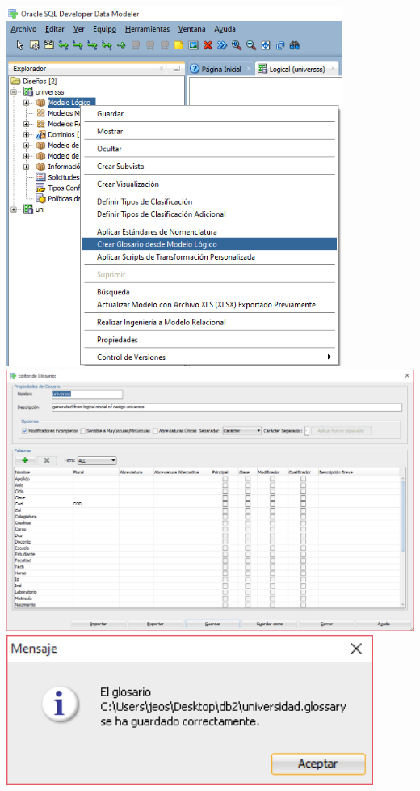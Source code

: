 \documentclass[a4paper,openright,12pt]{book}
\begin{document}
\begin{center}
\includegraphics[width=11cm]{./images/5-1 Ejercicio 1/1.png}\\
\includegraphics[width=17cm]{./images/5-1 Ejercicio 1/2.png}\\
\includegraphics[width=12cm]{./images/5-1 Ejercicio 1/3.png}\\
\end{center}
\end{document}
